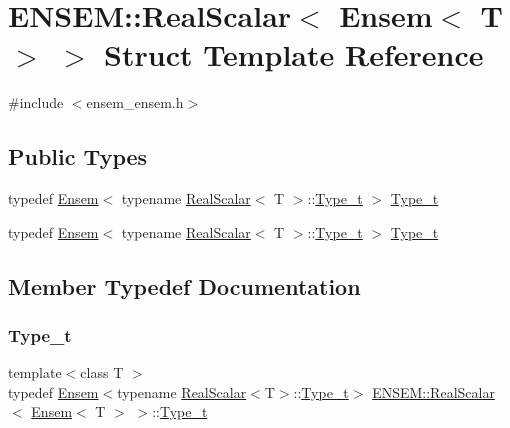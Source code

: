 \hypertarget{structENSEM_1_1RealScalar_3_01Ensem_3_01T_01_4_01_4}{}\section{E\+N\+S\+EM\+:\+:Real\+Scalar$<$ Ensem$<$ T $>$ $>$ Struct Template Reference}
\label{structENSEM_1_1RealScalar_3_01Ensem_3_01T_01_4_01_4}


{\ttfamily \#include $<$ensem\+\_\+ensem.\+h$>$}

\subsection*{Public Types}
\begin{DoxyCompactItemize}
\item 
typedef \mbox{\hyperlink{classENSEM_1_1Ensem}{Ensem}}$<$ typename \mbox{\hyperlink{structENSEM_1_1RealScalar}{Real\+Scalar}}$<$ T $>$\+::\mbox{\hyperlink{structENSEM_1_1RealScalar_3_01Ensem_3_01T_01_4_01_4_a7822ecdfc2f8d6c24460263831283db8}{Type\+\_\+t}} $>$ \mbox{\hyperlink{structENSEM_1_1RealScalar_3_01Ensem_3_01T_01_4_01_4_a7822ecdfc2f8d6c24460263831283db8}{Type\+\_\+t}}
\item 
typedef \mbox{\hyperlink{classENSEM_1_1Ensem}{Ensem}}$<$ typename \mbox{\hyperlink{structENSEM_1_1RealScalar}{Real\+Scalar}}$<$ T $>$\+::\mbox{\hyperlink{structENSEM_1_1RealScalar_3_01Ensem_3_01T_01_4_01_4_a7822ecdfc2f8d6c24460263831283db8}{Type\+\_\+t}} $>$ \mbox{\hyperlink{structENSEM_1_1RealScalar_3_01Ensem_3_01T_01_4_01_4_a7822ecdfc2f8d6c24460263831283db8}{Type\+\_\+t}}
\end{DoxyCompactItemize}


\subsection{Member Typedef Documentation}
\mbox{\label{structENSEM_1_1RealScalar_3_01Ensem_3_01T_01_4_01_4_a7822ecdfc2f8d6c24460263831283db8}} 
\subsubsection{\texorpdfstring{Type\_t}{Type\_t}\hspace{0.1cm}{\footnotesize\ttfamily [1/2]}}
{\footnotesize\ttfamily template$<$class T $>$ \\
typedef \mbox{\hyperlink{classENSEM_1_1Ensem}{Ensem}}$<$typename \mbox{\hyperlink{structENSEM_1_1RealScalar}{Real\+Scalar}}$<$T$>$\+::\mbox{\hyperlink{structENSEM_1_1RealScalar_3_01Ensem_3_01T_01_4_01_4_a7822ecdfc2f8d6c24460263831283db8}{Type\+\_\+t}}$>$ \mbox{\hyperlink{structENSEM_1_1RealScalar}{E\+N\+S\+E\+M\+::\+Real\+Scalar}}$<$ \mbox{\hyperlink{classENSEM_1_1Ensem}{Ensem}}$<$ T $>$ $>$\+::\mbox{\hyperlink{structENSEM_1_1RealScalar_3_01Ensem_3_01T_01_4_01_4_a7822ecdfc2f8d6c24460263831283db8}{Type\+\_\+t}}}

